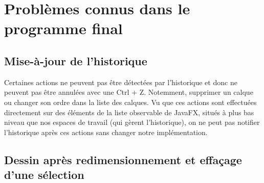 \section{Problèmes connus dans le programme final}
\subsection{Mise-à-jour de l'historique}
Certaines actions ne peuvent pas être détectées par l'historique et donc ne peuvent pas être annulées avec une Ctrl + Z. Notemment, supprimer un calque ou changer son ordre dans la liste des calques. Vu que ces actions sont effectuées directement sur des éléments de la liste observable de JavaFX, situés à plus bas niveau que nos espaces de travail (qui gèrent l'historique), on ne peut pas notifier l'historique après ces actions sans changer notre implémentation.
\subsection{Dessin après redimensionnement et effaçage d'une sélection}